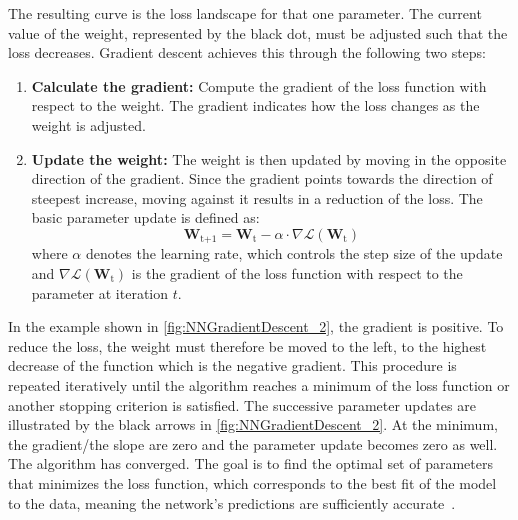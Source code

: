 The resulting curve is the loss landscape for that one parameter. 
The current value of the weight, represented by the black dot, must be adjusted such that the loss decreases. Gradient descent achieves this through the following two steps:
\begin{enumerate}
	\item \textbf{Calculate the gradient:} 
	Compute the gradient of the loss function with respect to the weight. 
	The gradient indicates how the loss changes as the weight is adjusted.
	\item \textbf{Update the weight:} The weight is then updated by moving in the opposite direction of the gradient. 
	Since the gradient points towards the direction of steepest increase, moving against it results in a reduction of the loss.
	The basic parameter update is defined as:
	\begin{equation}	
		\mathbf{W}_{\text{t+1}} = \mathbf{W}_{\text{t}} - \alpha \cdot \nabla \mathcal{L}(\mathbf{W}_{\text{t}})
	\end{equation}
	where $\alpha$ denotes the learning rate, which controls the step size of the update and $\nabla \mathcal{L}(\mathbf{W}_{\text{t}})$ is the gradient of the loss function with respect to the parameter at iteration $t$.
\end{enumerate}


In the example shown in \autoref{fig:NNGradientDescent_2}, the gradient is positive. To reduce the loss, the weight must therefore be moved to the left, to the highest decrease of the function which is the negative gradient.
This procedure is repeated iteratively until the algorithm reaches a minimum of the loss function or another stopping criterion is satisfied. The successive parameter updates are illustrated by the black arrows in \autoref{fig:NNGradientDescent_2}. At the minimum, the gradient/the slope are zero and the parameter update becomes zero as well. The algorithm has converged. 
The goal is to find the optimal set of parameters that minimizes the loss function, which corresponds to the best fit of the model to the data, meaning the network's predictions are sufficiently accurate~\cite{Bottou2016OptimizationMF}. 




